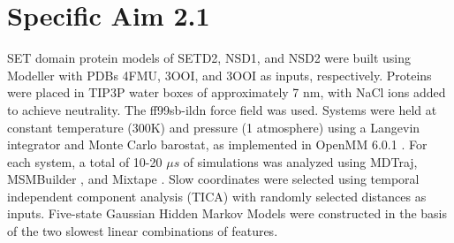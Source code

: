 \documentclass[12pt]{article}
\begin{document}
\section{Specific Aim 2.1}

SET domain protein models of SETD2, NSD1, and NSD2 were built using Modeller with PDBs 4FMU, 3OOI, and 3OOI as inputs, respectively.  Proteins were placed in TIP3P water boxes of approximately 7 nm, with NaCl ions added to achieve neutrality.  The ff99sb-ildn force field \cite{} was used.  Systems were held at constant temperature (300K) and pressure (1 atmosphere) using a Langevin integrator and Monte Carlo barostat, as implemented in OpenMM 6.0.1 \cite{}.  For each system, a total of 10-20 $\mu s$ of simulations was analyzed using MDTraj, MSMBuilder \cite{}, and Mixtape \cite{}.  Slow coordinates were selected using temporal independent component analysis (TICA) \cite{} with randomly selected distances as inputs.  Five-state Gaussian Hidden Markov Models were constructed in the basis of the two slowest linear combinations of features.
\end{document}
